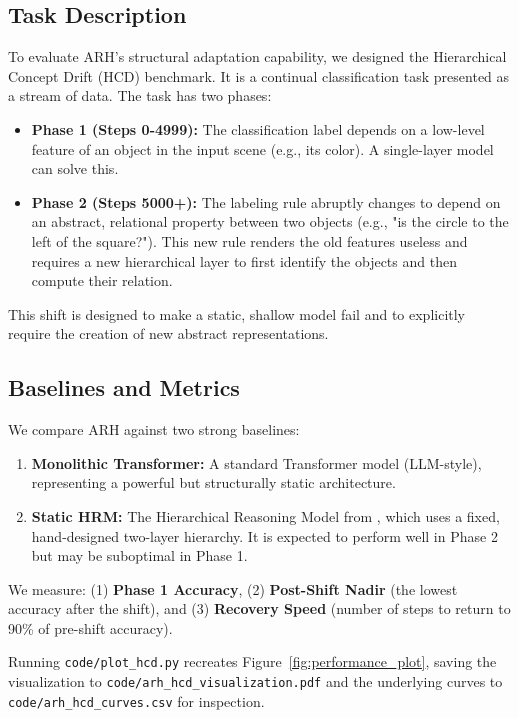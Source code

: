 \documentclass{article}
\begin{document}
\subsection{Task Description}
To evaluate ARH's structural adaptation capability, we designed the Hierarchical Concept Drift (HCD) benchmark. It is a continual classification task presented as a stream of data. The task has two phases:
\begin{itemize}
    \item \textbf{Phase 1 (Steps 0-4999):} The classification label depends on a low-level feature of an object in the input scene (e.g., its color). A single-layer model can solve this.
    \item \textbf{Phase 2 (Steps 5000+):} The labeling rule abruptly changes to depend on an abstract, relational property between two objects (e.g., "is the circle to the left of the square?"). This new rule renders the old features useless and requires a new hierarchical layer to first identify the objects and then compute their relation.
\end{itemize}
This shift is designed to make a static, shallow model fail and to explicitly require the creation of new abstract representations.

\subsection{Baselines and Metrics}
We compare ARH against two strong baselines:
\begin{enumerate}
    \item \textbf{Monolithic Transformer:} A standard Transformer model (LLM-style), representing a powerful but structurally static architecture.
    \item \textbf{Static HRM:} The Hierarchical Reasoning Model from \citet{HRM2025}, which uses a fixed, hand-designed two-layer hierarchy. It is expected to perform well in Phase 2 but may be suboptimal in Phase 1.
\end{enumerate}
We measure: (1) \textbf{Phase 1 Accuracy}, (2) \textbf{Post-Shift Nadir} (the lowest accuracy after the shift), and (3) \textbf{Recovery Speed} (number of steps to return to 90\% of pre-shift accuracy).

Running \texttt{code/plot\_hcd.py} recreates Figure~\ref{fig:performance_plot}, saving the visualization to \texttt{code/arh\_hcd\_visualization.pdf} and the underlying curves to \texttt{code/arh\_hcd\_curves.csv} for inspection.
\end{document}
